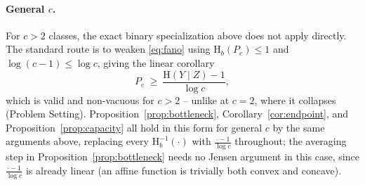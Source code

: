 \documentclass[letterpaper]{article} %
\newcommand{\Hh}{\mathrm{H}}
\theoremstyle{plain}
\theoremstyle{definition}
\begin{document}
\paragraph{General $c$.} For $c>2$ classes, the exact binary specialization above does not apply directly. The standard route is to weaken \eqref{eq:fano} using $\Hh_b(P_e)\le 1$ and $\log(c-1)\le\log c$, giving the linear corollary
\[
P_e\ \ge\ \frac{\Hh(Y\mid Z)-1}{\log c},
\]
which is valid and non-vacuous for $c>2$ -- unlike at $c=2$, where it collapses (Problem Setting). Proposition~\ref{prop:bottleneck}, Corollary~\ref{cor:endpoint}, and Proposition~\ref{prop:capacity} all hold in this form for general $c$ by the same arguments above, replacing every $\Hh_b^{-1}(\cdot)$ with $\tfrac{\cdot-1}{\log c}$ throughout; the averaging step in Proposition~\ref{prop:bottleneck} needs no Jensen argument in this case, since $\tfrac{\cdot-1}{\log c}$ is already linear (an affine function is trivially both convex and concave).


\end{document}
